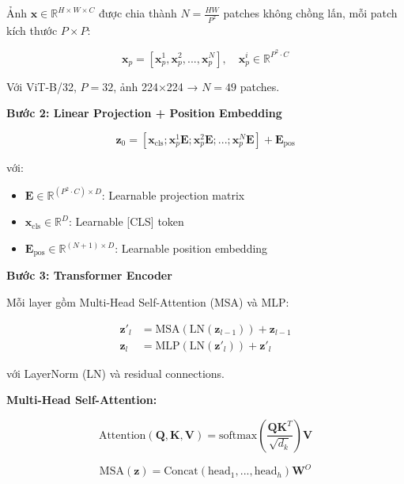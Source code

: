 \documentclass[12pt,a4paper]{article}
\begin{document}
Ảnh $\mathbf{x} \in \mathbb{R}^{H \times W \times C}$ được chia thành $N = \frac{HW}{P^2}$ patches không chồng lấn, mỗi patch kích thước $P \times P$:

\begin{equation}
    \mathbf{x}_p = [\mathbf{x}_p^1, \mathbf{x}_p^2, ..., \mathbf{x}_p^N], \quad \mathbf{x}_p^i \in \mathbb{R}^{P^2 \cdot C}
\end{equation}

Với ViT-B/32, $P=32$, ảnh 224×224 → $N = 49$ patches.

\textbf{Bước 2: Linear Projection + Position Embedding}

\begin{equation}
    \mathbf{z}_0 = [\mathbf{x}_{\text{cls}}; \mathbf{x}_p^1 \mathbf{E}; \mathbf{x}_p^2 \mathbf{E}; ...; \mathbf{x}_p^N \mathbf{E}] + \mathbf{E}_{\text{pos}}
\end{equation}

với:
\begin{itemize}
    \item $\mathbf{E} \in \mathbb{R}^{(P^2 \cdot C) \times D}$: Learnable projection matrix
    \item $\mathbf{x}_{\text{cls}} \in \mathbb{R}^{D}$: Learnable [CLS] token
    \item $\mathbf{E}_{\text{pos}} \in \mathbb{R}^{(N+1) \times D}$: Learnable position embedding
\end{itemize}

\textbf{Bước 3: Transformer Encoder}

Mỗi layer gồm Multi-Head Self-Attention (MSA) và MLP:

\begin{align}
    \mathbf{z}'_l &= \text{MSA}(\text{LN}(\mathbf{z}_{l-1})) + \mathbf{z}_{l-1} \\
    \mathbf{z}_l &= \text{MLP}(\text{LN}(\mathbf{z}'_l)) + \mathbf{z}'_l
\end{align}

với LayerNorm (LN) và residual connections.

\textbf{Multi-Head Self-Attention:}

\begin{equation}
    \text{Attention}(\mathbf{Q}, \mathbf{K}, \mathbf{V}) = \text{softmax}\left(\frac{\mathbf{Q}\mathbf{K}^T}{\sqrt{d_k}}\right)\mathbf{V}
\end{equation}

\begin{equation}
    \text{MSA}(\mathbf{z}) = \text{Concat}(\text{head}_1, ..., \text{head}_h)\mathbf{W}^O
\end{equation}
\end{document}
